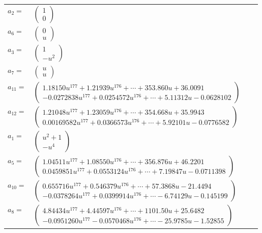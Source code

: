 \documentclass[1p]{elsarticle_modified}
\theoremstyle{definition}
\begin{document}
\begin{tabular}{m{7pt} m{180pt} m{7pt} m{180pt} }
\flushright $a_{2}=$&$\begin{pmatrix}1\\0\end{pmatrix}$ \\
\flushright $a_{6}=$&$\begin{pmatrix}0\\u\end{pmatrix}$ \\
\flushright $a_{3}=$&$\begin{pmatrix}1\\- u^2\end{pmatrix}$ \\
\flushright $a_{7}=$&$\begin{pmatrix}u\\u\end{pmatrix}$ \\
\flushright $a_{11}=$&$\begin{pmatrix}1.18150 u^{177}+1.21939 u^{176}+\cdots+353.860 u+36.0091\\-0.0272838 u^{177}+0.0254572 u^{176}+\cdots+5.11312 u-0.0628102\end{pmatrix}$ \\
\flushright $a_{12}=$&$\begin{pmatrix}1.21048 u^{177}+1.23059 u^{176}+\cdots+354.668 u+35.9943\\0.00169582 u^{177}+0.0366573 u^{176}+\cdots+5.92101 u-0.0776582\end{pmatrix}$ \\
\flushright $a_{1}=$&$\begin{pmatrix}u^2+1\\- u^4\end{pmatrix}$ \\
\flushright $a_{5}=$&$\begin{pmatrix}1.04511 u^{177}+1.08550 u^{176}+\cdots+356.876 u+46.2201\\0.0459851 u^{177}+0.0553124 u^{176}+\cdots+7.19847 u-0.0711398\end{pmatrix}$ \\
\flushright $a_{10}=$&$\begin{pmatrix}0.655716 u^{177}+0.546379 u^{176}+\cdots+57.3868 u-21.4494\\-0.0378264 u^{177}+0.0399914 u^{176}+\cdots-6.74129 u-0.145199\end{pmatrix}$ \\
\flushright $a_{8}=$&$\begin{pmatrix}4.84434 u^{177}+4.44597 u^{176}+\cdots+1101.50 u+25.6482\\-0.0951260 u^{177}-0.0570468 u^{176}+\cdots-25.9785 u-1.52855\end{pmatrix}$ \\

\end{tabular}
\end{document}
